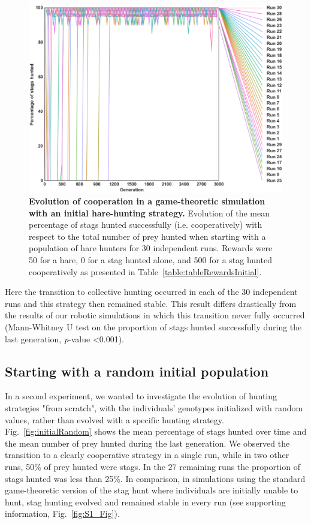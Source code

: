     \begin{figure}[h]
      \centering
          \includegraphics[scale = 0.40]{fig/ArticleBio1/Fig4.eps}
      \caption{\textbf{Evolution of cooperation in a game-theoretic simulation with an initial hare-hunting strategy.} 
      Evolution of the mean percentage of stags hunted successfully (i.e. cooperatively) with respect to the total number of prey hunted when starting with a population of hare hunters for 30 independent runs. Rewards were 50 for a hare, 0 for a stag hunted alone, and 500 for a stag hunted cooperatively as presented in Table~\ref{table:tableRewardsInitial}.}
      \label{fig:hareHuntersTheo}
    \end{figure}

    Here the transition to collective hunting occurred in each of the 30 independent runs and this strategy then remained stable. This result differs drastically from the results of our robotic simulations in which this transition never fully occurred (Mann-Whitney U test on the proportion of stags hunted successfully during the last generation, {\em p}-value \textless 0.001).


  \subsection{Starting with a random initial population}
    In a second experiment, we wanted to investigate the evolution of hunting strategies "from scratch", with the individuals' genotypes initialized with random values, rather than evolved with a specific hunting strategy. Fig.~\ref{fig:initialRandom} shows the mean percentage of stags hunted over time and the mean number of prey hunted during the last generation. We observed the transition to a clearly cooperative strategy in a single run, while in two other runs, 50\% of prey hunted were stags. In the $27$ remaining runs the proportion of stags hunted was less than 25\%. In comparison, in simulations using the standard game-theoretic version of the stag hunt where individuals are initially unable to hunt, stag hunting evolved and remained stable in every run (see supporting information, Fig.~\ref{fig:S1_Fig}).

